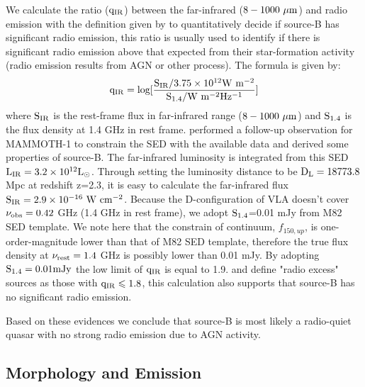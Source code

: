 	 We calculate the ratio ($\rm q_{IR}$) between the far-infrared ($\rm 8-1000 \ \mu m$) and radio emission with the definition given by \cite{ivison2010far} to quantitatively decide if source-B has significant radio emission, this ratio is usually used to identify if there is significant radio emission above that expected from their star-formation activity (radio emission results from AGN or other process). The formula is given by:
	\begin{equation}
		\rm q_{IR}=log[\frac{S_{IR}/3.75 \times 10^{12} W \ m^{-2}}{S_{1.4}/W \ m^{-2} Hz^{-1}}]
		\label{q_IR}
	\end{equation}
	where $\rm S_{IR}$ is the rest-frame flux in far-infrared range ($8-1000 \ \rm \mu m $) and $\rm S_{1.4}$ is the flux density at 1.4 GHz in rest frame. \citet{arrigoni2018overdensity} performed a follow-up observation for MAMMOTH-1 to constrain the SED with the available data and derived some properties of source-B. The far-infrared luminosity is integrated from this SED $\rm L_{IR}=3.2 \times 10^{12}L_{\odot}$. Through setting the luminosity distance to be $\rm D_{L}=18773.8$ Mpc at redshift z=2.3, it is easy to calculate the far-infrared flux $\rm S_{IR}=2.9 \times 10^{-16}\ W \ cm^{-2}$.  Because the D-configuration of VLA doesn't cover $\rm \nu_{obs}=0.42$ GHz (1.4 GHz in rest frame), we adopt $\rm S_{1.4}$=0.01 mJy from M82 SED template. We note here that the constrain of continuum, $f_{150,up}$, is one-order-magnitude lower than that of M82 SED template, therefore the true flux density at $\rm \nu_{rest}=1.4$ GHz is possibly lower than 0.01 mJy. By adopting $\rm S_{1.4}=0.01 mJy$ the low limit of $\rm q_{IR}$ is equal to 1.9. \citet{ivison2010far} and \citet{del2013goods} define "radio excess" sources as those with $\rm q_{IR} \leqslant 1.8$, this calculation also supports that source-B has no significant radio emission.
	
	Based on these evidences we conclude that source-B is most likely a radio-quiet quasar with no strong radio emission due to AGN activity.


\subsection{Morphology and Emission}

